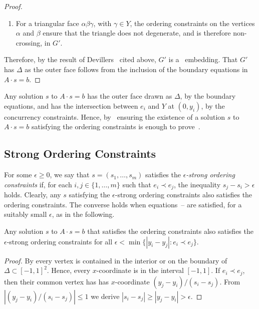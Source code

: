 \begin{proof}
\begin{enumerate}
		\item
		For a triangular face $\alpha\beta\gamma$, with $\gamma\in Y$, 
		the ordering constraints on the vertices $\alpha$ and $\beta$
		ensure that the triangle does not degenerate, and is therefore non-crossing, in $G'$.
	\end{enumerate}
	Therefore, by the result of Devillers \etal\ cited above, $G'$
	is a \Fary\ embedding. That $G'$ has $\Delta$ as the outer
	face follows from the inclusion of the boundary equations in
	$A\cdot s = b$.
\end{proof}

Any solution $s$ to $A\cdot s=b$ has the outer face drawn as $\Delta$, by the boundary equations, and has the intersection between $e_i$ and $Y$ at $(0,y_i)$, by the concurrency constraints. Hence, by~ ensuring the existence of a solution $s$ to $A\cdot s=b$ satisfying the ordering constraints is enough to prove~.

\subsection{Strong Ordering Constraints}
\label{strong}

For some $\epsilon \ge 0$, we say that $s=(s_1,\ldots,s_m)$ satisfies
the \emph{$\epsilon$-strong ordering constraints} if, for each
$i,j\in\{1,\ldots,m\}$ such that $e_i\prec e_j$, the inequality
$s_j-s_i > \epsilon$ holds.
Clearly, any $s$ satisfying the $\epsilon$-strong ordering constraints also satisfies the ordering constraints. The converse holds when equations~\thetag{\ref{eq:slope0}}--\thetag{\ref{eq:proportion2}} are satisfied, for a suitably small $\epsilon$, as in the following.

\begin{lem}
	Any solution $s$ to $A\cdot s=b$ that satisfies
	the ordering constraints
	also satisfies 
	the $\epsilon$-strong ordering constraints
	for all $\epsilon<\min\{|y_i-y_j| : e_i\prec e_j\}$.
\end{lem}

\begin{proof}
	By  every vertex is contained in the interior or on the boundary of $\Delta\subset[-1,1]^2$.
	Hence, every $x$-coordinate is
	in the interval $[-1,1]$.
        If $e_i\prec e_j$, then their common vertex has
	has $x$-coordinate
	$(y_j-y_i)/(s_i-s_j)$.
	From $|(y_j-y_i)/(s_i-s_j)|\le 1$ we derive
	$|s_i-s_j|\ge|y_j-y_i| > \epsilon$.
\end{proof}

